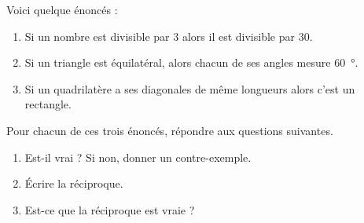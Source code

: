
\begin{exercice}\label{exosmath-0892}

    Voici quelque énoncés :
    \begin{enumerate}
        \item
            Si un nombre est divisible par \( 3\) alors il est divisible par \( 30\).
        \item
            Si un triangle est équilatéral, alors chacun de ses angles mesure \SI{60}{\degree}.
        \item
            Si un quadrilatère a ses diagonales de même longueurs alors c'est un rectangle.
    \end{enumerate}
    
    Pour chacun de ces trois énoncés, répondre aux questions suivantes.
    \begin{enumerate}
        \item
            Est-il vrai ? Si non, donner un contre-exemple.
        \item
            Écrire la réciproque.
        \item
            Est-ce que la réciproque est vraie ?
    \end{enumerate}

\end{exercice}
